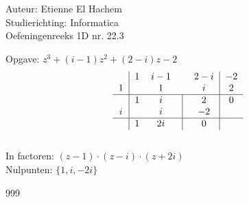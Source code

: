 \documentclass[a4paper]{article}
\begin{document}
  
\noindent \large Auteur: Etienne El Hachem \\
\noindent \large Studierichting: Informatica\\
\noindent \large Oefeningenreeks 1D nr. 22.3\\

\medskip

\normalsize

Opgave: $z^3 + (i - 1)z^2 + (2 - i)z - 2$ \\

\[
\begin{tabular}{c|cccc|c}
& $1$ & $i - 1$ & & $2 - i$ & $-2$ \\

$1$ & & $1$ & & $i$ & $2$ \\ \hline

& $1$ & $i$ & \vline & $2$ & $0$ \\

$i$ & & $i$ & \vline & $-2$ & \\ \hline

& $1$ & $2i$ & \vline & $0$ &
\end{tabular}
\] \\

In factoren: $(z - 1) \cdot (z - i) \cdot (z + 2i)$  \\

Nulpunten: $\{1, i, -2i\}$

\begin{thebibliography}{999}
\end{thebibliography}
\end{document}
